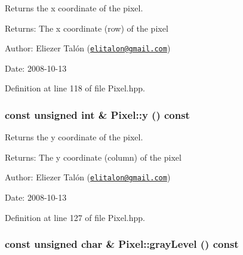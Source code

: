 Returns the x coordinate of the pixel. 

\begin{Desc}
\item[Returns:]The x coordinate (row) of the pixel\end{Desc}
\begin{Desc}
\item[Author:]Eliezer Talón (\href{mailto:elitalon@gmail.com}{\tt elitalon@gmail.com}) \end{Desc}
\begin{Desc}
\item[Date:]2008-10-13 \end{Desc}


Definition at line 118 of file Pixel.hpp.\hypertarget{class_pixel_9ed8db7cb358be3bf3409a0a31963e9d}{
\subsubsection[y]{\setlength{\rightskip}{0pt plus 5cm}const unsigned int \& Pixel::y () const}}
\label{class_pixel_9ed8db7cb358be3bf3409a0a31963e9d}


Returns the y coordinate of the pixel. 

\begin{Desc}
\item[Returns:]The y coordinate (column) of the pixel\end{Desc}
\begin{Desc}
\item[Author:]Eliezer Talón (\href{mailto:elitalon@gmail.com}{\tt elitalon@gmail.com}) \end{Desc}
\begin{Desc}
\item[Date:]2008-10-13 \end{Desc}


Definition at line 127 of file Pixel.hpp.\hypertarget{class_pixel_f27beae979bf0fab21987996d4a2d110}{
\subsubsection[grayLevel]{\setlength{\rightskip}{0pt plus 5cm}const unsigned char \& Pixel::grayLevel () const}}
\label{class_pixel_f27beae979bf0fab21987996d4a2d110}


